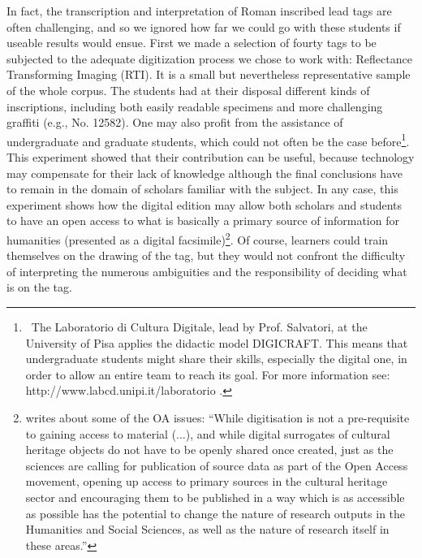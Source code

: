 \documentclass[amsthm,ebook]{saparticle}
\begin{document}
\noindent In fact, the transcription and interpretation of Roman inscribed lead tags are often challenging, and so we ignored how
far we could go with these students if useable results would ensue. First we made a selection of fourty tags to be
subjected to the adequate digitization process we chose to work with: Reflectance Transforming Imaging (RTI). It is a
small but nevertheless representative sample of the whole corpus. The students had at their disposal different kinds of
inscriptions, including both easily readable specimens and more challenging graffiti (e.g., No. 12582). One may also
profit from the assistance of undergraduate and graduate students, which could not often be the case
before\footnote{\ The Laboratorio di Cultura Digitale, lead by Prof. Salvatori, at the University of Pisa applies the
didactic model DIGICRAFT. This means that undergraduate students might share their skills, especially the digital one,
in order to allow an entire team to reach its goal. For more information see: http://www.labcd.unipi.it/laboratorio .}.
This experiment showed that their contribution can be useful, because technology may compensate for their lack of
knowledge although the final conclusions have to remain in the domain of scholars familiar with the subject. In any
case, this experiment shows how the digital edition may allow both scholars and students to have an open access to what
is basically a primary source of information for humanities (presented as a digital facsimile)\footnote{\citep{gorman_opening_2015}
writes about some of the OA issues: ``While digitisation is not a pre-requisite to gaining access to material (...), and
while digital surrogates of cultural heritage objects do not have to be openly shared once created, just as the
sciences are calling for publication of source data as part of the Open Access movement, opening up access to primary
sources in the cultural heritage sector and encouraging them to be published in a way which is as accessible as
possible has the potential to change the nature of research outputs in the Humanities and Social Sciences, as well as
the nature of research itself in these areas.''}. Of course, learners could train themselves on the drawing of the tag,
but they would not confront the difficulty of interpreting the numerous ambiguities and the responsibility of deciding
what is on the tag. 
\end{document}
